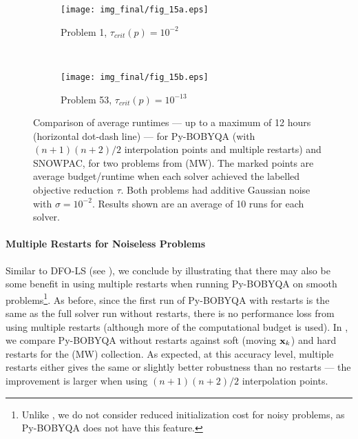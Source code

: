 \begin{figure}
	\centering
	\begin{subfigure}[b]{0.48\textwidth}
		\texttt{[image: img\_final/fig\_15a.eps]}
		\caption{Problem 1, $\tau_{crit}(p)=10^{-2}$}
	\end{subfigure}
	~
	\begin{subfigure}[b]{0.48\textwidth}
		\texttt{[image: img\_final/fig\_15b.eps]}
		\caption{Problem 53, $\tau_{crit}(p)=10^{-13}$}
	\end{subfigure}
	\caption{Comparison of average runtimes --- up to a maximum of 12 hours (horizontal dot-dash line) --- for Py-BOBYQA (with $(n+1)(n+2)/2$ interpolation points and multiple restarts) and SNOWPAC, for two problems from (MW). The marked points are average budget/runtime when each solver achieved the labelled objective reduction $\tau$. Both problems had additive Gaussian noise with $\sigma=10^{-2}$. Results shown are an average of 10 runs for each solver.}
	\label{fig_snowpac_timings}
\end{figure}

\paragraph{Multiple Restarts for Noiseless Problems}
Similar to DFO-LS (see ), we conclude by illustrating that there may also be some benefit in using multiple restarts when running Py-BOBYQA on smooth problems\footnote{\:Unlike , we do not consider reduced initialization cost for noisy problems, as Py-BOBYQA does not have this feature.}.
As before, since the first run of Py-BOBYQA with restarts is the same as the full solver run without restarts, there is no performance loss from using multiple restarts (although more of the computational budget is used).
In , we compare Py-BOBYQA without restarts against soft (moving $\mathbf{x}_k$) and hard restarts for the (MW) collection.
As expected, at this accuracy level, multiple restarts either gives the same or slightly better robustness than no restarts --- the improvement is larger when using $(n+1)(n+2)/2$ interpolation points.

